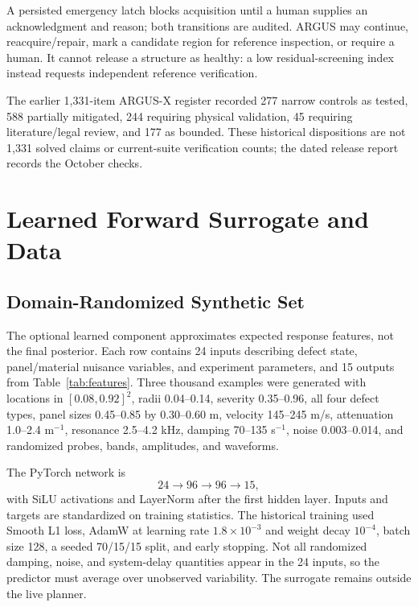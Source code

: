 \documentclass[conference]{IEEEtran}
\begin{document}
A persisted emergency latch blocks acquisition until a human supplies an acknowledgment and reason; both transitions are audited. ARGUS may continue, reacquire/repair, mark a candidate region for reference inspection, or require a human. It cannot release a structure as healthy: a low residual-screening index instead requests independent reference verification.

The earlier 1,331-item ARGUS-X register recorded 277 narrow controls as tested, 588 partially mitigated, 244 requiring physical validation, 45 requiring literature/legal review, and 177 as bounded. These historical dispositions are not 1,331 solved claims or current-suite verification counts; the dated release report records the October checks.

\section{Learned Forward Surrogate and Data}
\subsection{Domain-Randomized Synthetic Set}
The optional learned component approximates expected response features, not the final posterior. Each row contains 24 inputs describing defect state, panel/material nuisance variables, and experiment parameters, and 15 outputs from Table~\ref{tab:features}. Three thousand examples were generated with locations in $[0.08,0.92]^2$, radii 0.04--0.14, severity 0.35--0.96, all four defect types, panel sizes 0.45--0.85 by 0.30--0.60 m, velocity 145--245 m/s, attenuation 1.0--2.4 m$^{-1}$, resonance 2.5--4.2 kHz, damping 70--135 s$^{-1}$, noise 0.003--0.014, and randomized probes, bands, amplitudes, and waveforms.

The PyTorch \cite{paszke2019} network is
\begin{equation}
 24\rightarrow96\rightarrow96\rightarrow15,
\end{equation}
with SiLU activations and LayerNorm after the first hidden layer. Inputs and targets are standardized on training statistics. The historical training used Smooth L1 loss, AdamW at learning rate $1.8\times10^{-3}$ and weight decay $10^{-4}$, batch size 128, a seeded 70/15/15 split, and early stopping. Not all randomized damping, noise, and system-delay quantities appear in the 24 inputs, so the predictor must average over unobserved variability. The surrogate remains outside the live planner.
\end{document}

